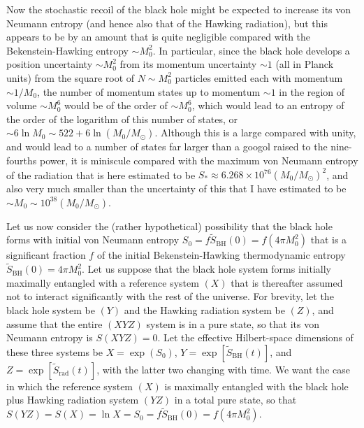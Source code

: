 \documentclass[12pt]{article}
\begin{document}
Now the stochastic recoil of the black hole might be expected to increase its von Neumann entropy (and hence also that of the Hawking radiation), but this appears to be by an amount that is quite negligible compared with the Bekenstein-Hawking entropy $\sim M_0^2$.  In particular, since the black hole develops a position uncertainty $\sim M_0^2$ from its momentum uncertainty $\sim 1$ (all in Planck units) from the square root of $N \sim M_0^2$ particles emitted each with momentum $\sim 1/M_0$, the number of momentum states up to momentum $\sim 1$ in the region of volume $\sim M_0^6$ would be of the order of $\sim M_0^6$, which would lead to an entropy of the order of the logarithm of this number of states, or $\sim 6\ln{M_0} \sim 522 + 6\ln{(M_0/M_\odot)}$.  Although this is a large compared with unity, and would lead to a number of states far larger than a googol raised to the nine-fourths power, it is miniscule compared with the maximum von Neumann entropy of the radiation that is here estimated to be $S_\ast \approx 6.268\times 10^{76} (M_0/M_\odot)^2$, and also very much smaller than the uncertainty of this that I have estimated to be $\sim M_0 \sim 10^{38} (M_0/M_\odot)$.




Let us now consider the (rather hypothetical) possibility that the black hole forms with initial von Neumann entropy $S_0 = f\tilde{S}_\mathrm{BH}(0) = f(4\pi M_0^2)$ that is a significant fraction $f$ of the initial Bekenstein-Hawking thermodynamic entropy $\tilde{S}_\mathrm{BH}(0) = 4\pi M_0^2$. Let us suppose that the black hole system forms initially maximally entangled with a reference system $(X)$ \cite{Braunstein} that is thereafter assumed not to interact significantly with the rest of the universe.  For brevity, let the black hole system be $(Y)$ and the Hawking radiation system be $(Z)$, and assume that the entire $(XYZ)$ system is in a pure state, so that its von Neumann entropy is $S(XYZ) = 0$.  Let the effective Hilbert-space dimensions of these three systems be $X = \exp{(S_0)}$, $Y = \exp{[\tilde{S}_\mathrm{BH}(t)]}$, and $Z = \exp{[\tilde{S}_\mathrm{rad}(t)]}$, with the latter two changing with time.  We want the case in which the reference system $(X)$ is maximally entangled with the black hole plus Hawking radiation system $(YZ)$ in a total pure state, so that $S(YZ) = S(X) = \ln{X} = S_0 = f\tilde{S}_\mathrm{BH}(0) = f(4\pi M_0^2)$.
\end{document}
